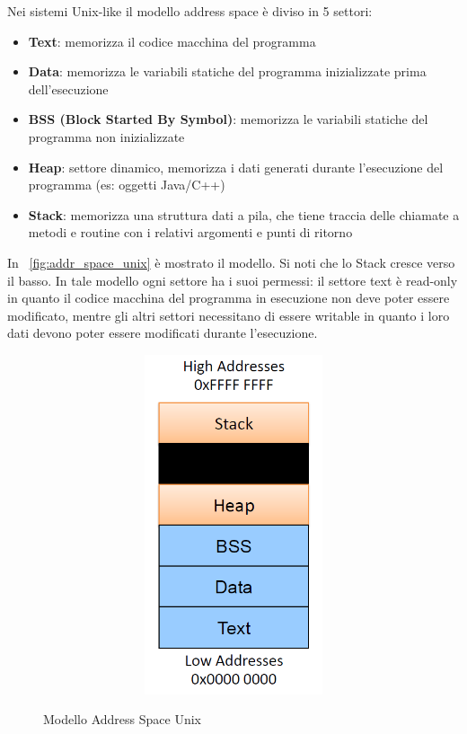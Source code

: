 Nei sistemi Unix-like il modello address space è diviso in 5 settori:
\begin{itemize}
  \item \textbf{Text}: memorizza il codice macchina del programma
  \item \textbf{Data}: memorizza le variabili statiche del programma inizializzate prima dell'esecuzione
  \item	\textbf{BSS (Block Started By Symbol)}: memorizza le variabili statiche del programma non inizializzate
  \item	\textbf{Heap}: settore dinamico, memorizza i dati generati durante l’esecuzione del programma (es: oggetti Java/C++) 
  \item	\textbf{Stack}: memorizza una struttura dati a pila, che tiene traccia delle chiamate a metodi e routine con i relativi argomenti e punti di ritorno 
\end{itemize}
In \figurename ~\ref{fig:addr_space_unix} è mostrato il modello. Si noti che lo Stack cresce verso il basso. In tale modello ogni settore ha i suoi permessi: il settore text è read-only in quanto il codice macchina del programma in esecuzione non deve poter essere modificato, mentre gli altri settori necessitano di essere writable in quanto i loro dati devono poter essere modificati durante l’esecuzione.
\begin{figure}[htbp]
	\centering
	\subfigure
	{\includegraphics[height=10cm, width=13cm, keepaspectratio]{Immagini/sistemi_operativi/addr_space_unix.png}}
	\caption{Modello Address Space Unix \label{fig:salt}} 	
\end{figure}

